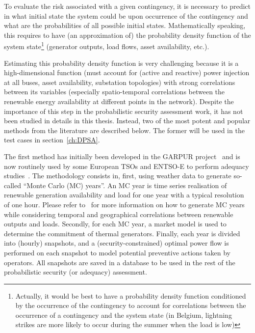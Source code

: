 To evaluate the risk associated with a given contingency, it is necessary to predict in what initial state the system could be upon occurrence of the contingency and what are the probabilities of all possible initial states. Mathematically speaking, this requires to have (an approximation of) the probability density function of the system state\footnote{Actually, it would be best to have a probability density function conditioned by the occurrence of the contingency to account for correlations between the occurrence of a contingency and the system state (\eg in Belgium, lightning strikes are more likely to occur during the summer when the load is low)} (generator outputs, load flows, asset availability, etc.).

Estimating this probability density function is very challenging because it is a high-dimensional function (must account for (active and reactive) power injection at all buses, asset availability, substation topologies) with strong correlations between its variables (especially spatio-temporal correlations between the renewable energy availability at different points in the network). Despite the importance of this step in the probabilistic security assessment work, it has not been studied in details in this thesis. Instead, two of the most potent and popular methods from the literature are described below. The former will be used in the test cases in section~\ref{ch:DPSA}.

The first method has initially been developed in the GARPUR project~\cite{StrathElia, StrathGARPUR} and is now routinely used by some European TSOs and ENTSO-E to perform adequacy studies~\cite{ACER_MC_year, EliaAdequacy}. The methodology consists in, first, using weather data to generate so-called ``Monte Carlo (MC) years''. An MC year is time series realisation of renewable generation availability and load for one year with a typical resolution of one hour. Please refer to~\cite{StrathGARPUR} for more information on how to generate MC years while considering temporal and geographical correlations between renewable outputs and loads. Secondly, for each MC year, a market model is used to determine the commitment of thermal generators. Finally, each year is divided into (\eg hourly) snapshots, and a (security-constrained) optimal power flow is performed on each snapshot to model potential preventive actions taken by operators. All snapshots are saved in a database to be used in the rest of the probabilistic security (or adequacy) assessment. %

